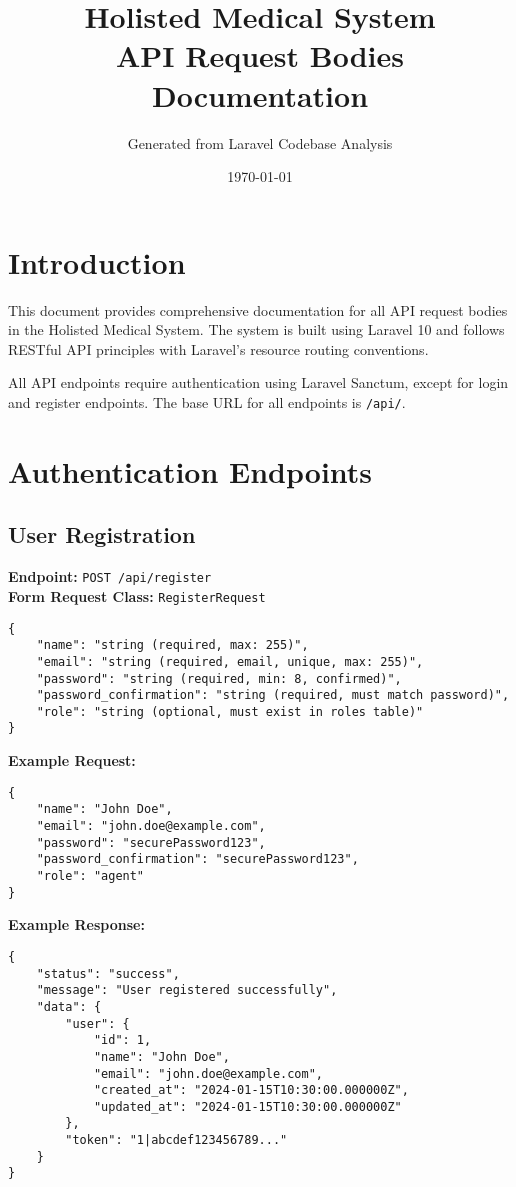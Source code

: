 \documentclass[12pt,a4paper]{article}
\title{\textbf{Holisted Medical System\\API Request Bodies Documentation}}
\author{Generated from Laravel Codebase Analysis}
\date{\today}
\begin{document}
\maketitle
\tableofcontents
\newpage

\section{Introduction}

This document provides comprehensive documentation for all API request bodies in the Holisted Medical System. The system is built using Laravel 10 and follows RESTful API principles with Laravel's resource routing conventions.

All API endpoints require authentication using Laravel Sanctum, except for login and register endpoints. The base URL for all endpoints is \texttt{/api/}.

\section{Authentication Endpoints}

\subsection{User Registration}
\textbf{Endpoint:} \texttt{POST /api/register}\\
\textbf{Form Request Class:} \texttt{RegisterRequest}

\begin{lstlisting}[caption=Register Request Body]
{
    "name": "string (required, max: 255)",
    "email": "string (required, email, unique, max: 255)",
    "password": "string (required, min: 8, confirmed)",
    "password_confirmation": "string (required, must match password)",
    "role": "string (optional, must exist in roles table)"
}
\end{lstlisting}

\textbf{Example Request:}
\begin{lstlisting}[caption=Register Example Request]
{
    "name": "John Doe",
    "email": "john.doe@example.com",
    "password": "securePassword123",
    "password_confirmation": "securePassword123",
    "role": "agent"
}
\end{lstlisting}

\textbf{Example Response:}
\begin{lstlisting}[caption=Register Example Response]
{
    "status": "success",
    "message": "User registered successfully",
    "data": {
        "user": {
            "id": 1,
            "name": "John Doe",
            "email": "john.doe@example.com",
            "created_at": "2024-01-15T10:30:00.000000Z",
            "updated_at": "2024-01-15T10:30:00.000000Z"
        },
        "token": "1|abcdef123456789..."
    }
}
\end{lstlisting}
\end{document}
